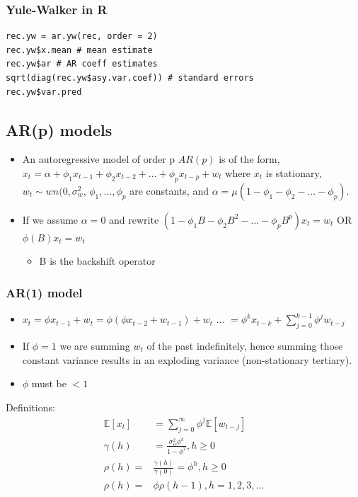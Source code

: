 \documentclass{article}
\begin{document}
\subsubsection{Yule-Walker in R}
\begin{lstlisting}
rec.yw = ar.yw(rec, order = 2)
rec.yw$x.mean # mean estimate
rec.yw$ar # AR coeff estimates
sqrt(diag(rec.yw$asy.var.coef)) # standard errors
rec.yw$var.pred
\end{lstlisting}


\subsection{AR(p) models}
\begin{itemize}
    \item An autoregressive model of order p $AR(p)$ is of the form, $x_t = \alpha + \phi_1 x_{t-1} + \phi_2 x_{t-2} + ... + \phi_p x_{t-p} + w_t$ where $x_t$ is stationary, $w_t \sim wn(0,\sigma^2_w$, $\phi_1, ..., \phi_p$ are constants, and $\alpha = \mu ( 1 - \phi_1 - \phi_2 - ... - \phi_p)$.
    \item If we assume $\alpha = 0$ and rewrite $(1 - \phi_1 B - \phi_2 B^2 - ... - \phi_p B^p)x_t = w_t$ OR $\phi(B) x_t = w_t$
    \begin{itemize}
        \item B is the backshift operator
    \end{itemize}
\end{itemize}

\subsubsection{AR(1) model}
\begin{itemize}
    \item $x_t = \phi x_{t-1} + w_t = \phi (\phi x_{t-2} + w_{t-1}) + w_t$ ... $ = \phi^k x_{t-k} + \sum_{j=0}^{k-1} \phi^j w_{t-j}$
    \item If $\phi = 1$ we are summing $ w_t$ of the past indefinitely, hence summing those constant variance results in an exploding variance (non-stationary tertiary).
    \item $\phi$ must be $<1$
\end{itemize}

Definitions:
\begin{align*}
    \mathbb{E}[x_t] &= \sum_{j=0} ^\infty \phi^j \mathbb{E}[w_{t-j}]\\
    \gamma(h) &= \frac{\sigma^2_w \phi^h}{1 - \phi^2 } , h \geq 0\\
    \rho(h) =& \frac{\gamma(h)}{\gamma(0)} = \phi^h, h \geq 0\\
    \rho(h) =& \phi \rho(h-1) , h = 1,2,3,...\\
\end{align*}
\end{document}
